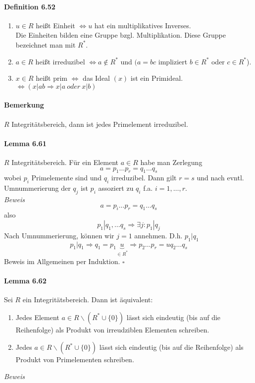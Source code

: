 \documentclass{scrartcl}
\begin{document}
\paragraph{Definition 6.52}
\begin{enumerate}
\item $u \in R$ heißt Einheit $\Leftrightarrow u$ hat ein multiplikatives Inverses.
  \\
  Die Einheiten bilden eine Gruppe bzgl. Multiplikation. Diese Gruppe bezeichnet
  man mit $R^*$.
\item $a \in R$ heißt irreduzibel $\Leftrightarrow a \notin R^*$ und $(a = bc$
  impliziert $b \in R^*$ oder $c \in R^*$).
\item $x \in R$ heißt prim $\Leftrightarrow$ das Ideal $(x)$ ist ein Primideal.
  $\Leftrightarrow (x|ab \Rightarrow x|a ~oder~ x|b)$
\end{enumerate}

\paragraph{Bemerkung}
$R$ Integritätsbereich, dann ist jedes Primelement irreduzibel.

\paragraph{Lemma 6.61}
$R$ Integritätsbereich. Für ein Element $a \in R$ habe man Zerlegung
\[
  a = p_1 \dots p_r = q_1 \dots q_s
\]
wobei $p_i$ Primelemente sind und $q_i$ irreduzibel. Dann gilt $r = s$ und nach
evntl. Umnummerierung der $q_j$ ist $p_i$ assoziert zu $q_i$
f.a. $i = 1, \dots, r$. \\
\textit{Beweis}
\[
  a = p_i \dots p_r = q_1 \dots q_s
\]
also
\[
  p_1|q_1, \dots q_s \Rightarrow \exists j: p_1|q_j
\]
Nach Umnummerierung, können wir $j = 1$ annehmen. D.h. $p_1|q_1$
\[
  p_1|q_1 \Rightarrow q_1 = p_1\underbrace{u}_{\in R^*}
  \Rightarrow p_2 \dots p_r = uq_2 \dots q_s
\]
Beweis im Allgemeinen per Induktion.
\hfill $\square$

\paragraph{Lemma 6.62}
Sei $R$ ein Integritätsbereich. Dann ist äquivalent:
\begin{enumerate}
\item Jedes Element $a \in R\backslash (R^*\cup \{0\})$ lässt sich eindeutig
  (bis auf die Reihenfolge) als Produkt von irreudziblen Elementen schreiben.
\item Jedes $a \in R\backslash (R^*\cup \{0\})$ lässt sich eindeutig
  (bis auf die Reihenfolge) als Produkt von Primelementen schreiben. 
\end{enumerate}
\textit{Beweis}
\end{document}

